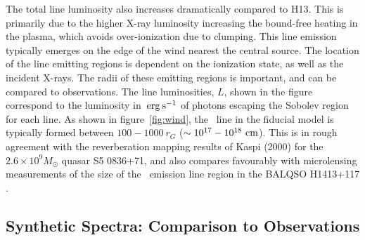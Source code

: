 \documentclass[useAMS,usenatbib]{mn2e_x}
\begin{document}
The total line luminosity also increases dramatically compared to H13. 
This is primarily due to the higher X-ray luminosity increasing the bound-free
heating in the plasma, which avoids over-ionization due to clumping.
This line emission typically emerges on the edge of the wind
nearest the central source. The location of the line emitting regions
is dependent on the ionization state, as well as the incident X-rays.
The radii of these emitting regions is important,
and can be compared to observations. The line luminosities, $L$,
shown in the figure correspond to the luminosity in $\:{\rm erg\:s^{-1}}$ of photons
escaping the Sobolev region for each line. 
As shown in figure~\ref{fig:wind},
the \civ\ line in the fiducial model is typically formed between 
$100-1000~r_G$ ($\sim10^{17}-10^{18}~\rm{cm}$).
This is in rough agreement with the reverberation mapping 
results of Kaspi (2000) for the $2.6\times10^{9} M_\odot$ quasar S5 0836+71,
and also compares favourably with microlensing measurements of the size of the
\civ\ emission line region in the BALQSO H1413+117 \citep{odowd2015}.


\subsection{Synthetic Spectra: Comparison to Observations}
\end{document}
